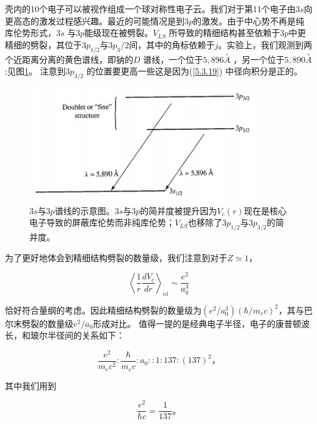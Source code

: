 ﻿\documentclass[UTF8,twoside]{ctexart}
\begin{document}
\noindent 壳内的10个电子可以被视作组成一个球对称性电子云。我们对于第11个电子由$3s$向更高态的激发过程感兴趣。最近的可能情况是到$3p$的激发。由于中心势不再是纯库伦势形式，$3s$ 与$3p$能级现在被劈裂。$V_{LS}$ 所导致的精细结构甚至依赖于$3p$中更精细的劈裂，其位于$3p_{1/2}$与$3p_3/2$间，其中的角标依赖于$j$。实验上，我们观测到两个近距离分离的黄色谱线，即钠的$D$ 谱线，一个位于$5,896\overset{\circ}{A}$ ，另一个位于$5,890\overset{\circ}{A}$;见图{\ref{Figure 5.2}}。 注意到$3p_{3/2}$ 的位置要更高一些这是因为(\ref{5.3.19}) 中径向积分是正的。

\begin{figure}
\begin{centering}
\includegraphics[width = 10cm]{./Graph/5.2.jpg}
\caption{$3s$与$3p$谱线的示意图。$3s$与$3p$的简并度被提升因为$V_c(r)$现在是核心电子导致的屏蔽库伦势而非纯库伦势；$V_{LS}$也移除了$3p_{1/2}$与$3p_{3/2}$的简并度。}
\label {Figure 5.2}
\end{centering}
\end{figure}


为了更好地体会到精细结构劈裂的数量级，我们注意到对于$Z\simeq 1$，

\begin{equation} \label{5.3.22}
\left\langle\dfrac{1}{r}\dfrac{dV_c}{dr}\right\rangle_{nl}\sim\dfrac{e^2}{a_0^3}
\end{equation}

\noindent 恰好符合量纲的考虑。因此精细结构劈裂的数量级为$(e^2/a_0^3)(\hbar/m_ec)^2$，其与巴尔末劈裂的数量级$e^2/a_0$形成对比。 值得一提的是经典电子半径，电子的康普顿波长，和玻尔半径间的关系如下：

\begin{equation} \label{5.3.23}
\dfrac{e^2}{m_ec^2}:\dfrac{\hbar}{m_ec}:a_0::1:137:(137)^2\text{，}
\end{equation}

\noindent 其中我们用到

\begin{equation} \label{5.3.24}
\dfrac{e^2}{\hbar c}=\dfrac{1}{137}\text{。}
\end{equation}
\end{document}
